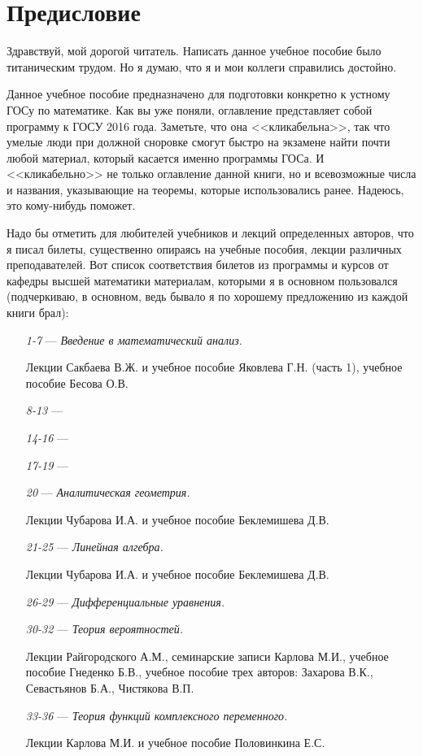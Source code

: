 \chapter{Предисловие}
Здравствуй, мой дорогой читатель. Написать данное учебное пособие было титаническим трудом. Но я думаю, что я и мои коллеги справились достойно.

Данное учебное пособие предназначено для подготовки конкретно к устному ГОСу по математике. Как вы уже поняли, оглавление представляет собой программу к ГОСУ 2016 года. Заметьте, что она <<кликабельна>>, так что умелые люди при должной сноровке смогут быстро на экзамене найти почти любой материал, который касается именно программы ГОСа. И <<кликабельно>> не только оглавление данной книги, но и всевозможные числа и названия, указывающие на теоремы, которые использовались ранее. Надеюсь, это кому-нибудь поможет. 

Надо бы отметить для любителей учебников и лекций определенных авторов, что я писал билеты, существенно опираясь на учебные пособия, лекции различных преподавателей. Вот список соответствия билетов из программы и курсов от кафедры высшей математики материалам, которыми я в основном пользовался (подчеркиваю, в основном, ведь бывало я по хорошему предложению из каждой книги брал):
\begin{itemize}
\item[\textit{1-7}]
\; --- \: \textit{Введение в математический анализ.} 

Лекции Сакбаева В.Ж. и учебное пособие Яковлева Г.Н. (часть 1), учебное пособие Бесова О.В.
\item[\textit{8-13}]
\; --- \:
\item[\textit{14-16}]
\; --- \:
\item[\textit{17-19}]
\; --- \:
\item[\textit{20}] 
\; --- \: \textit{Аналитическая геометрия.}

Лекции Чубарова И.А. и учебное пособие Беклемишева Д.В.
\item[\textit{21-25}] 
\; --- \: \textit{Линейная алгебра.}

Лекции Чубарова И.А. и учебное пособие Беклемишева Д.В.
\item[\textit{26-29}] 
\; --- \: \textit{Дифференциальные уравнения.}


\item[\textit{30-32}]
\; --- \: \textit{Теория вероятностей.}

Лекции Райгородского А.М., семинарские записи Карлова М.И., учебное пособие Гнеденко Б.В., учебное пособие трех авторов: Захарова В.К., Севастьянов Б.А., Чистякова В.П.
\item[\textit{33-36}]
\; --- \: \textit{Теория функций комплексного переменного.}

Лекции Карлова М.И. и учебное пособие Половинкина Е.С.
\end{itemize}


